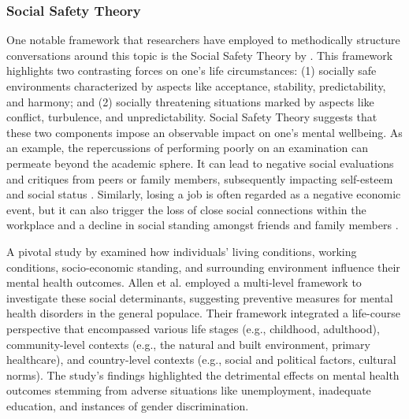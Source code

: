 \subsubsection{Social Safety Theory}
One notable framework that researchers have employed to methodically structure conversations around this topic is the Social Safety Theory by \citet{slavich2020social}. This framework highlights two contrasting forces on one's life circumstances: (1) socially safe environments characterized by aspects like acceptance, stability, predictability, and harmony; and (2) socially threatening situations marked by aspects like conflict, turbulence, and unpredictability. Social Safety Theory suggests that these two components impose an observable impact on one's mental wellbeing. 
As an example, the repercussions of performing poorly on an examination can permeate beyond the academic sphere. It can lead to negative social evaluations and critiques from peers or family members, subsequently impacting self-esteem and social status \cite{diamond2022rethinking, noronha2018study, bhattacharjee2021understanding}. Similarly, losing a job is often regarded as a negative economic event, but it can also trigger the loss of close social connections within the workplace and a decline in social standing amongst friends and family members \cite{diamond2022rethinking, katz2017self}.

A pivotal study by \citet{allen2014social} examined how individuals' living conditions, working conditions, socio-economic standing, and surrounding environment influence their mental health outcomes. Allen et al. employed a multi-level framework to investigate these social determinants, suggesting preventive measures for mental health disorders in the general populace. Their framework integrated a life-course perspective that encompassed various life stages (e.g., childhood, adulthood), community-level contexts (e.g., the natural and built environment, primary healthcare), and country-level contexts (e.g., social and political factors, cultural norms). The study's findings highlighted the detrimental effects on mental health outcomes stemming from adverse situations like unemployment, inadequate education, and instances of gender discrimination.

